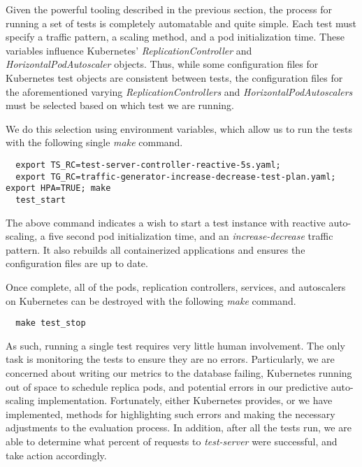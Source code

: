 Given the powerful tooling described in the previous section, the process for
running a set of tests is completely automatable and quite simple. Each test
must specify a traffic pattern, a scaling method, and a pod initialization time.
These variables influence Kubernetes' \textit{ReplicationController} and
\textit{HorizontalPodAutoscaler} objects. Thus, while some configuration files
for Kubernetes test objects are consistent between tests, the configuration
files for the aforementioned varying \textit{ReplicationControllers} and
\textit{HorizontalPodAutoscalers} must be selected based on which test we are
running.

We do this selection using environment variables, which allow us to run the
tests with the following single \textit{make} command.

\begin{verbatim}
  export TS_RC=test-server-controller-reactive-5s.yaml;
  export TG_RC=traffic-generator-increase-decrease-test-plan.yaml; export HPA=TRUE; make
  test_start
\end{verbatim}

The above command indicates a wish to start a test instance with reactive
auto-scaling, a five second pod initialization time, and an
\textit{increase-decrease} traffic pattern. It also rebuilds all containerized
applications and ensures the configuration files are up to date.

Once complete, all of the pods, replication controllers, services, and
autoscalers on Kubernetes can be destroyed with the following \textit{make}
command.

\begin{verbatim}
  make test_stop
\end{verbatim}

As such, running a single test requires very little human involvement. The only
task is monitoring the tests to ensure they are no errors. Particularly, we are
concerned about writing our metrics to the database failing, Kubernetes
running out of space to schedule replica pods, and potential errors in our
predictive auto-scaling implementation. Fortunately, either Kubernetes provides,
or we have implemented, methods for highlighting such errors and making the
necessary adjustments to the evaluation process. In addition, after all the
tests run, we are able to determine what percent of requests to
\textit{test-server} were successful, and take action accordingly.
